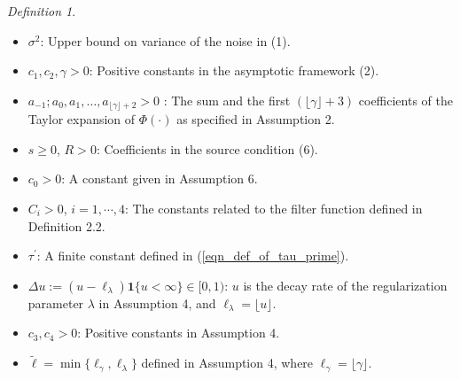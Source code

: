 \documentclass{article}
\theoremstyle{plain}
\theoremstyle{definition}
\theoremstyle{remark}
\newtheorem{definition}[theorem]{Definition}
\begin{document}
\begin{appendix}
\begin{definition}
\begin{itemize}
    \item \(\sigma^2\): Upper bound on variance of the noise in (1).

    \vspace{3pt}
    
    \item \(c_1, c_2, \gamma > 0\): Positive constants in the asymptotic framework (2). 

    \vspace{3pt}

    \item \(a_{-1}; a_0, a_1, \ldots, a_{\lfloor \gamma \rfloor + 2} > 0\) : The sum and the first $(\lfloor \gamma \rfloor+ 3)$ coefficients of the Taylor expansion of \(\Phi(\cdot)\) as specified in Assumption 2.

    \vspace{3pt}

    \item \(s \geq 0\), $R>0$: Coefficients in the source condition  (6).

    \vspace{3pt}

    \item $c_{0} >0$: A constant given in Assumption 6.

    \vspace{3pt}
    
    \item $C_i > 0$, $i=1, \cdots, 4$: The constants related to the filter function defined in Definition 2.2.

    \vspace{3pt}

    \item $\tau^{\prime}$: A finite constant defined in (\ref{eqn_def_of_tau_prime}).

    \vspace{3pt}

    \item $\Delta u :=(u - \ell_{\lambda})\mathbf{1}\{u<\infty\} \in [0, 1)$: $u$ is the decay rate of the regularization parameter $\lambda$ in Assumption 4, and $\ell_{\lambda} = \lfloor u \rfloor$.

    \vspace{3pt}

    \item \(c_3, c_4 > 0\): Positive constants in Assumption 4. 

    \vspace{3pt}

    \item $\tilde{\ell}=\min\{\ell_{\gamma}, \ell_{\lambda}\}$ defined in Assumption 4, where $\ell_{\gamma} = \lfloor \gamma \rfloor$.
    

\end{itemize}
\end{definition}
\end{appendix}
\end{document}
